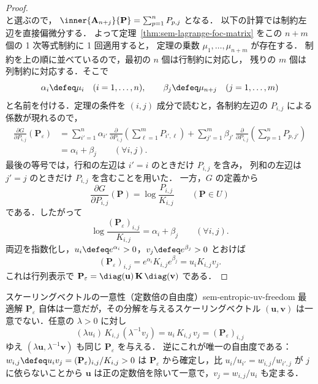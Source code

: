 \begin{proof}
\[  \]
  と選ぶので，
  $\inner{\mathbf{A}_{n+j}}{\mathbf{P}}=\sum_{p=1}^{n}P_{p,j}$ となる．
  以下の計算では制約左辺を直接偏微分する．
  よって定理~\ref{thm:sem-lagrange-foc-matrix} をこの $n+m$ 個の 1 次等式制約に 1 回適用すると，
  定理の乗数 $\mu_1,\dots,\mu_{n+m}$ が存在する．
  制約を上の順に並べているので，最初の $n$ 個は行制約に対応し，
  残りの $m$ 個は列制約に対応する．そこで
  \[
    \alpha_i \defeq \mu_i \quad (i=1,\dots,n),
    \qquad
    \beta_j \defeq \mu_{n+j} \quad (j=1,\dots,m)
  \]
  と名前を付ける．定理の条件を $(i,j)$ 成分で読むと，各制約左辺の
  $P_{i,j}$ による係数が現れるので，
  \begin{align*}
    \frac{\partial G}{\partial P_{i,j}}(\mathbf{P}_\varepsilon)
    &=
    \sum_{i'=1}^{n}\alpha_{i'}\,
    \frac{\partial}{\partial P_{i,j}}
    \left(\sum_{\ell=1}^{m}P_{i',\ell}\right)
    +
    \sum_{j'=1}^{m}\beta_{j'}\,
    \frac{\partial}{\partial P_{i,j}}
    \left(\sum_{p=1}^{n}P_{p,j'}\right) \\
    &=
    \alpha_i+\beta_j
    \qquad (\forall i,j).
  \end{align*}
  最後の等号では，行和の左辺は $i'=i$ のときだけ $P_{i,j}$ を含み，
  列和の左辺は $j'=j$ のときだけ $P_{i,j}$ を含むことを用いた．
  一方，$G$ の定義から
  \[
    \frac{\partial G}{\partial P_{i,j}}(\mathbf{P})
    =
    \log\frac{P_{i,j}}{K_{i,j}}
    \qquad (\mathbf{P}\in U)
  \]
  である．したがって
  \[
    \log\frac{(\mathbf{P}_\varepsilon)_{i,j}}{K_{i,j}}
    =
    \alpha_i+\beta_j
    \qquad (\forall i,j).
  \]
  両辺を指数化し，$u_i \defeq e^{\alpha_i} > 0$，$v_j \defeq e^{\beta_j} > 0$ とおけば
  \[
    (\mathbf{P}_\varepsilon)_{i,j}
    =
    e^{\alpha_i} K_{i,j} e^{\beta_j}
    =
    u_i K_{i,j} v_j .
  \]
  これは行列表示で
  $\mathbf{P}_\varepsilon = \diag(\mathbf{u})\,\mathbf{K}\,\diag(\mathbf{v})$
  である．
\end{proof}

\begin{remark}{スケーリングベクトルの一意性（定数倍の自由度）}{sem-entropic-uv-freedom}
  最適解 $\mathbf{P}_\varepsilon$ 自体は一意だが，その分解を与えるスケーリングベクトル
  $(\mathbf{u}, \mathbf{v})$ は一意でない．任意の $\lambda > 0$ に対し
  \[
    (\lambda u_i)\, K_{i,j}\, (\lambda^{-1} v_j) = u_i\, K_{i,j}\, v_j = (\mathbf{P}_\varepsilon)_{i,j}
  \]
  ゆえ $(\lambda\mathbf{u}, \lambda^{-1}\mathbf{v})$ も同じ $\mathbf{P}_\varepsilon$ を与える．
  逆にこれが唯一の自由度である：$w_{i,j} \defeq u_i v_j = (\mathbf{P}_\varepsilon)_{i,j}/K_{i,j} > 0$ は
  $\mathbf{P}_\varepsilon$ から確定し，比 $u_i/u_{i'} = w_{i,j}/w_{i',j}$ が $j$ に依らないことから
  $\mathbf{u}$ は正の定数倍を除いて一意で，$v_j = w_{i,j}/u_i$ も定まる．
\end{remark}

